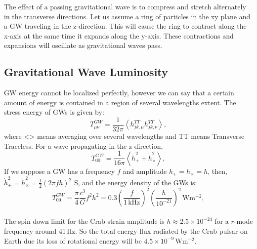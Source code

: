 \documentclass{ttuthes2007}
\begin{document}
	The effect of a passing gravitational wave is to compress and stretch
alternately in the transverse directions. Let us assume a ring of particles in
the xy
plane and a \ac{GW} traveling in the  z-direction. This will cause the
ring to contract along the x-axis at the same time it expands along the y-axis. These
contractions and expansions will oscillate as  gravitational waves pass. 

\subsection{Gravitational Wave Luminosity}
\ac{GW} energy cannot be localized perfectly,
however we can say that a certain amount of energy is contained in a region of
several wavelengths extent. The stress energy of \acp{GW} is given by:
\begin{equation}
T_{\mu\nu}^{GW} = \frac{1}{32\pi}\left\langle
h_{jk,\mu}^{TT}h_{jk,\nu}^{TT}\right\rangle,
\end{equation}
where <> means averaging over several wavelengths and TT means Transverse
Traceless.
For a wave propagating in the z-direction, 
\begin{equation}
T_{00}^{GW}=\frac{1}{16\pi}\left\langle\dot{h}_+^2+\dot{h}_\times
^2\right\rangle,
\end{equation}
If we suppose a \ac{GW} has a frequency $f$ and amplitude $h_+ = h_\times = h$,
then, $\dot{h}_+^2 = \dot{h}_\times^2 = \frac{1}{2}(2\pi fh)^2$
S, and the energy density of the \acp{GW} is:
\begin{equation}
T_{00}^{GW} = \frac{\pi}{4}\frac{c^3}{G}f^2
h^2=0.3\left(\frac{f}{1\,\mathrm{kHz}}\right )^2
\left(\frac{h}{10^{-21}}\right )^2\,\mathrm{Wm^{-2}},
\end{equation}
\\
The spin down limit for the Crab strain amplitude is $h\approx 2.5 \times 10^{-24}$
for a
$r$-mode frequency around 41\,Hz. So the total energy flux radiated by the Crab pulsar
on Earth due its loss of rotational energy will be
$4.5\times10^{-9}\,\mathrm{Wm^{-2}}$.
\end{document}
